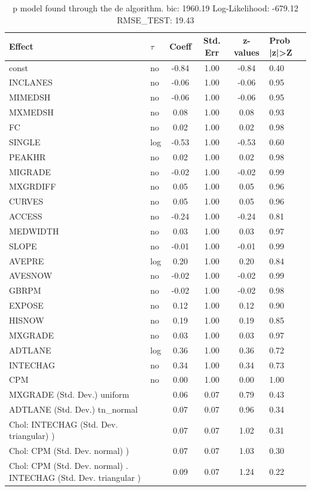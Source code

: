 \begin{table}
	\caption{p model found through the de algorithm. bic: 1960.19 Log-Likelihood: -679.12 RMSE_TEST: 19.43}
	\begin{center}
		\begin{tabular}{|l|l|c|c|c|l|}
			\hline
			Effect & $\tau$ & Coeff & Std. Err & z-values & Prob |z|>Z \\
			\hline
			const & no & -0.84 & 1.00 & -0.84 & 0.40 \\
			\hline
			INCLANES & no & -0.06 & 1.00 & -0.06 & 0.95 \\
			\hline
			MIMEDSH & no & -0.06 & 1.00 & -0.06 & 0.95 \\
			\hline
			MXMEDSH & no & 0.08 & 1.00 & 0.08 & 0.93 \\
			\hline
			FC & no & 0.02 & 1.00 & 0.02 & 0.98 \\
			\hline
			SINGLE & log & -0.53 & 1.00 & -0.53 & 0.60 \\
			\hline
			PEAKHR & no & 0.02 & 1.00 & 0.02 & 0.98 \\
			\hline
			MIGRADE & no & -0.02 & 1.00 & -0.02 & 0.99 \\
			\hline
			MXGRDIFF & no & 0.05 & 1.00 & 0.05 & 0.96 \\
			\hline
			CURVES & no & 0.05 & 1.00 & 0.05 & 0.96 \\
			\hline
			ACCESS & no & -0.24 & 1.00 & -0.24 & 0.81 \\
			\hline
			MEDWIDTH & no & 0.03 & 1.00 & 0.03 & 0.97 \\
			\hline
			SLOPE & no & -0.01 & 1.00 & -0.01 & 0.99 \\
			\hline
			AVEPRE & log & 0.20 & 1.00 & 0.20 & 0.84 \\
			\hline
			AVESNOW & no & -0.02 & 1.00 & -0.02 & 0.99 \\
			\hline
			GBRPM & no & -0.02 & 1.00 & -0.02 & 0.98 \\
			\hline
			EXPOSE & no & 0.12 & 1.00 & 0.12 & 0.90 \\
			\hline
			HISNOW & no & 0.19 & 1.00 & 0.19 & 0.85 \\
			\hline
			MXGRADE & no & 0.03 & 1.00 & 0.03 & 0.97 \\
			\hline
			ADTLANE & log & 0.36 & 1.00 & 0.36 & 0.72 \\
			\hline
			INTECHAG & no & 0.34 & 1.00 & 0.34 & 0.73 \\
			\hline
			CPM & no & 0.00 & 1.00 & 0.00 & 1.00 \\
			\hline
			MXGRADE (Std. Dev.) uniform &  & 0.06 & 0.07 & 0.79 & 0.43 \\
			\hline
			ADTLANE (Std. Dev.) tn_normal &  & 0.07 & 0.07 & 0.96 & 0.34 \\
			\hline
			 Chol: INTECHAG (Std. Dev. triangular) ) &  & 0.07 & 0.07 & 1.02 & 0.31 \\
			\hline
			 Chol: CPM (Std. Dev. normal) ) &  & 0.07 & 0.07 & 1.03 & 0.30 \\
			\hline
			 Chol: CPM (Std. Dev. normal) . INTECHAG (Std. Dev.   triangular ) &  & 0.09 & 0.07 & 1.24 & 0.22 \\
			\hline
		\end{tabular}
	\end{center}
\end{table}